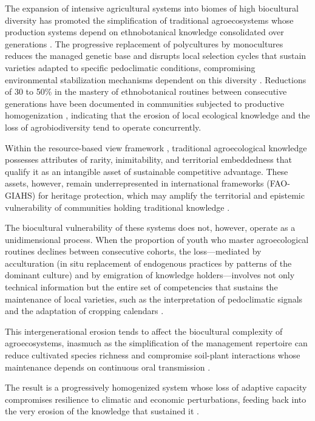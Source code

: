 \documentclass[12pt,a4paper]{article}
\begin{document}
The expansion of intensive agricultural systems into biomes of high biocultural diversity has promoted the simplification of traditional agroecosystems whose production systems depend on ethnobotanical knowledge consolidated over generations \citep{Altieri2004}. The progressive replacement of polycultures by monocultures reduces the managed genetic base and disrupts local selection cycles that sustain varieties adapted to specific pedoclimatic conditions, compromising environmental stabilization mechanisms dependent on this diversity \citep{Jarvis2008}. Reductions of 30 to 50\% in the mastery of ethnobotanical routines between consecutive generations have been documented in communities subjected to productive homogenization \citep{ReyesGarcia2013}, indicating that the erosion of local ecological knowledge and the loss of agrobiodiversity tend to operate concurrently.

Within the resource-based view framework \citep{Barney1991}, traditional agroecological knowledge possesses attributes of rarity, inimitability, and territorial embeddedness that qualify it as an intangible asset of sustainable competitive advantage. These assets, however, remain underrepresented in international frameworks (FAO-GIAHS) for heritage protection, which may amplify the territorial and epistemic vulnerability of communities holding traditional knowledge \citep{Santilli2009,Cunha2009,Goncalves2022}.

The biocultural vulnerability of these systems does not, however, operate as a unidimensional process. When the proportion of youth who master agroecological routines declines between consecutive cohorts, the loss---mediated by acculturation (in situ replacement of endogenous practices by patterns of the dominant culture) and by emigration of knowledge holders---involves not only technical information but the entire set of competencies that sustains the maintenance of local varieties, such as the interpretation of pedoclimatic signals and the adaptation of cropping calendars \citep{GomezBaggethun2013}.

This intergenerational erosion tends to affect the biocultural complexity of agroecosystems, inasmuch as the simplification of the management repertoire can reduce cultivated species richness and compromise soil-plant interactions whose maintenance depends on continuous oral transmission \citep{Brush2004,Bastos2022}.

The result is a progressively homogenized system whose loss of adaptive capacity compromises resilience to climatic and economic perturbations, feeding back into the very erosion of the knowledge that sustained it \citep{Aniah2019}.
\end{document}
